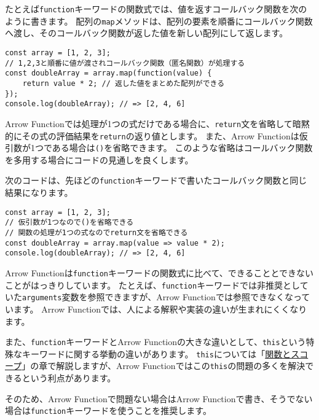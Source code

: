 たとえば\texttt{function}キーワードの関数式では、値を返すコールバック関数を次のように書きます。
配列の\texttt{map}メソッドは、配列の要素を順番にコールバック関数へ渡し、そのコールバック関数が返した値を新しい配列にして返します。

\begin{lstlisting}
const array = [1, 2, 3];
// 1,2,3と順番に値が渡されコールバック関数（匿名関数）が処理する
const doubleArray = array.map(function(value) {
    return value * 2; // 返した値をまとめた配列ができる
});
console.log(doubleArray); // => [2, 4, 6]
\end{lstlisting}

Arrow
Functionでは処理が1つの式だけである場合に、\texttt{return}文を省略して暗黙的にその式の評価結果を\texttt{return}の返り値とします。
また、Arrow
Functionは仮引数が1つである場合は\texttt{()}を省略できます。
このような省略はコールバック関数を多用する場合にコードの見通しを良くします。

次のコードは、先ほどの\texttt{function}キーワードで書いたコールバック関数と同じ結果になります。

\begin{lstlisting}
const array = [1, 2, 3];
// 仮引数が1つなので()を省略できる
// 関数の処理が1つの式なのでreturn文を省略できる
const doubleArray = array.map(value => value * 2);
console.log(doubleArray); // => [2, 4, 6]
\end{lstlisting}

Arrow
Functionは\texttt{function}キーワードの関数式に比べて、できることとできないことがはっきりしています。
たとえば、\texttt{function}キーワードでは非推奨としていた\texttt{arguments}変数を参照できますが、Arrow
Functionでは参照できなくなっています。 Arrow
Functionでは、人による解釈や実装の違いが生まれにくくなります。

また、\texttt{function}キーワードとArrow
Functionの大きな違いとして、\texttt{this}という特殊なキーワードに関する挙動の違いがあります。
\texttt{this}については「\hyperlink{function-and-scope}{関数とスコープ}」の章で解説しますが、Arrow
Functionではこの\texttt{this}の問題の多くを解決できるという利点があります。

そのため、Arrow Functionで問題ない場合はArrow
Functionで書き、そうでない場合は\texttt{function}キーワードを使うことを推奨します。

